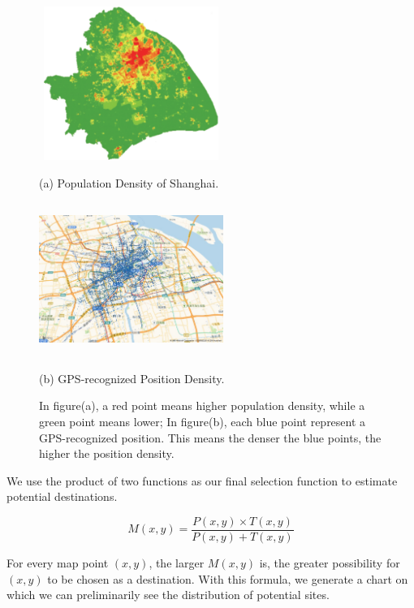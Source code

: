 \documentclass{mcmthesis}
\begin{document}
\begin{figure}[ht]
    \begin{minipage}{0.44\linewidth}
      \centerline{\includegraphics[height=5cm,width=6cm]{figures/Pd.jpg}}\cite{dqxxkx_ppl}
      \caption*{(a) Population Density of Shanghai.}
    \end{minipage}
    \hspace{0.5in}
    \begin{minipage}{0.44\linewidth}
      \centerline{\includegraphics[height=5cm,width=6cm]{figures/Tran.png}}
      \caption*{(b) GPS-recognized Position Density.}
    \end{minipage}
    \caption{In figure(a), a red point means higher population density, while a green point means lower; In figure(b), each blue point represent a GPS-recognized position. This means the denser the blue points, the higher the position density.}
\end{figure}

We use the product of two functions as our final selection function to estimate potential destinations.

\begin{equation}\label{eq_product&sum}
    M(x,y) = \frac{P(x,y) \times T(x,y)}{P(x,y) + T(x,y)}
\end{equation}

For every map point $(x,y)$, the larger $M(x,y)$ is, the greater possibility for $(x,y)$ to be chosen as a destination. With this formula, we generate a chart on which we can preliminarily see the distribution of potential sites.
\end{document}
